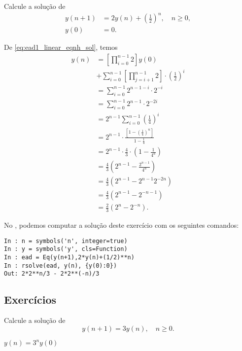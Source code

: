 \begin{exeresol}
  Calcule a solução de
  \begin{align}
    y(n+1) &= 2y(n) + \left(\frac{1}{2}\right)^n,\quad n\geq 0, \\
    y(0) &= 0.
  \end{align}
\end{exeresol}
\begin{resol}
  De \eqref{eq:ead1_linear_eqnh_sol}, temos
\begin{align}
  y(n) &= \left[\prod_{i=0}^{n-1} 2\right]y(0) \nonumber\\
       &+ \sum_{i=0}^{n-1}\left[\prod_{j=i+1}^{n-1} 2\right]\cdot\left(\frac{1}{2}\right)^i \\
       &= \sum_{i=0}^{n-1} 2^{n-1-i}\cdot 2^{-i} \\
       &= \sum_{i=0}^{n-1} 2^{n-1}\cdot 2^{-2i} \\
       &= 2^{n-1}\sum_{i=0}^{n-1}\left(\frac{1}{4}\right)^{i} \\
       &= 2^{n-1}\cdot \frac{\left[1-\left(\frac{1}{4}\right)^n\right]}{1-\frac{1}{4}} \\
       &=2^{n-1}\cdot\frac{4}{3}\cdot\left(1-\frac{1}{4^n}\right)\\
       &= \frac{4}{3}\left(2^{n-1} - \frac{2^{n-1}}{4^n}\right)\\
       &= \frac{4}{3}\left(2^{n-1} - 2^{n-1}2^{-2n}\right)\\
       &= \frac{4}{3}\left(2^{n-1}-2^{-n-1}\right)\\
       &= \frac{2}{3}\left(2^n-2^{-n}\right).
\end{align}

  \ifispython
  No \python, podemos computar a solução deste exercício com os seguintes comandos:
\begin{verbatim}
In : n = symbols('n', integer=true)
In : y = symbols('y', cls=Function)
In : ead = Eq(y(n+1),2*y(n)+(1/2)**n)
In : rsolve(ead, y(n), {y(0):0})
Out: 2*2**n/3 - 2*2**(-n)/3
\end{verbatim}
  \fi  
\end{resol}

\subsection*{Exercícios}

\begin{exer}
  Calcule a solução de
  \begin{equation}
    y(n+1) = 3y(n),\quad n\geq 0.
  \end{equation}
\end{exer}
\begin{resp}
  $y(n) = 3^ny(0)$
\end{resp}

